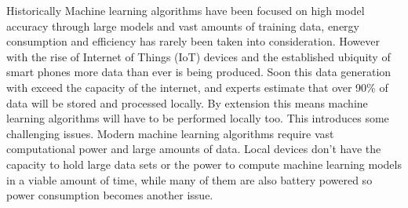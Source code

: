 Historically Machine learning algorithms have been focused on high model
accuracy through large models and vast amounts of training data, energy
consumption and efficiency has rarely been taken into consideration. However
with the rise of Internet of Things (IoT) devices and the established ubiquity
of smart phones more data than ever is being produced. Soon this data generation
with exceed the capacity of the internet, and experts estimate that over 90\% of
data will be stored and processed locally. \cite{Chaing2016FogIoT} By extension
this means machine learning algorithms will have to be performed locally too.
This introduces some challenging issues. Modern machine learning algorithms
require vast computational power and large amounts of data. Local devices don't
have the capacity to hold large data sets or the power to compute machine
learning models in a viable amount of time, while many of them are also battery
powered so power consumption becomes another issue.
